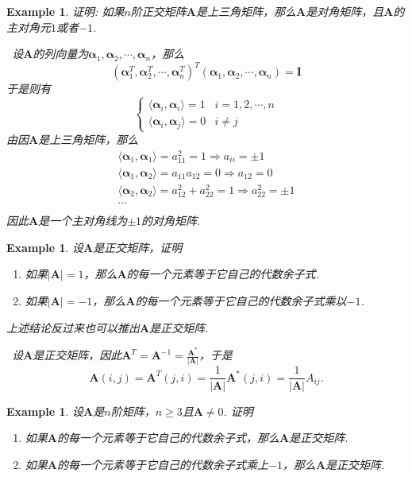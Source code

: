 \documentclass{article}
\newtheorem{example}[theorem]{Example}
\newcommand{\hints}{{\color{blue} \text{hints}}}
\newcommand{\mbf}[1]{\bm{#1}}
\newcommand\inp[2]{\langle #1, #2 \rangle} %
\begin{document}
\begin{example}
\rm 证明: 如果$n$阶正交矩阵$\mbf{A}$是上三角矩阵，那么$\mbf{A}$是对角矩阵，且$\mbf{A}$的主对角元$1$或者$-1$.

\hints\ 设$\mbf{A}$的列向量为$\mbf{\alpha}_1,\mbf{\alpha}_2,\cdots,\mbf{\alpha}_n$，那么
$$
(\mbf{\alpha}_1^T,\mbf{\alpha}_2^T,\cdots,\mbf{\alpha}_n^T)^T(\mbf{\alpha}_1,\mbf{\alpha}_2,\cdots,\mbf{\alpha}_n) = \mbf{I}
$$
于是则有
$$
\left\{
\begin{array}{ll}
\inp{\mbf{\alpha}_i}{\mbf{\alpha}_i} = 1 & i=1,2,\cdots,n \\
\inp{\mbf{\alpha}_i}{\mbf{\alpha}_j} = 0 & i \neq j
\end{array} \right.
$$ 
由因$\mbf{A}$是上三角矩阵，那么
$$
\begin{array}{ll}
\inp{\mbf{\alpha}_1}{\mbf{\alpha}_1} = a_{11}^2 = 1 \Rightarrow a_{ii} = \pm 1 \\
\inp{\mbf{\alpha}_1}{\mbf{\alpha}_2} = a_{11}a_{12} = 0 \Rightarrow a_{12} = 0  \\
\inp{\mbf{\alpha}_2}{\mbf{\alpha}_2} = a_{12}^2 +a_{22}^2 = 1 \Rightarrow a_{22}^2 = \pm 1 \\
\cdots \\
\end{array}
$$
因此$\mbf{A}$是一个主对角线为$\pm 1$的对角矩阵. 
\end{example}

\begin{example}
\rm 设$\mbf{A}$是正交矩阵，证明
\begin{enumerate}
	\item 如果$|\mbf{A}| = 1$，那么$\mbf{A}$的每一个元素等于它自己的代数余子式.
	\item 如果$|\mbf{A}| = -1$，那么$\mbf{A}$的每一个元素等于它自己的代数余子式乘以$-1$.
\end{enumerate}
上述结论反过来也可以推出$\mbf{A}$是正交矩阵. 

\hints\ 设$\mbf{A}$是正交矩阵，因此$\mbf{A}^T = \mbf{A}^{-1} = \frac{\mbf{A}^*}{|\mbf{A}|}$，于是
$$
\mbf{A}(i,j) = \mbf{A}^T(j,i) = \frac{1}{|\mbf{A}|}\mbf{A}^*(j,i) = \frac{1}{|\mbf{A}|}A_{ij}. 
$$
\end{example}

\begin{example}
\rm 设$\mbf{A}$是$n$阶矩阵，$n \geq 3$且$\mbf{A} \neq 0$. 证明
\begin{enumerate}
	\item 如果$\mbf{A}$的每一个元素等于它自己的代数余子式，那么$\mbf{A}$是正交矩阵. 
	\item 如果$\mbf{A}$的每一个元素等于它自己的代数余子式乘上$-1$，那么$\mbf{A}$是正交矩阵. 
\end{enumerate}
\end{example}
\end{document}
